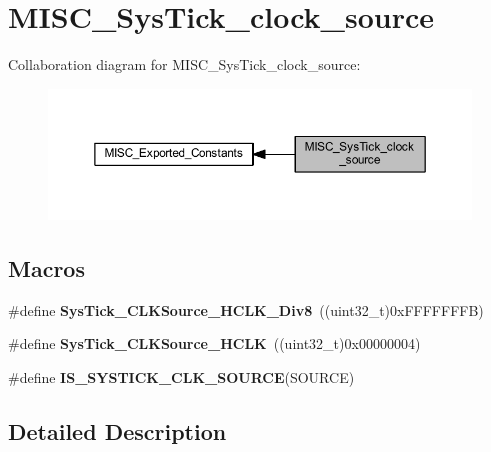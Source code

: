 \hypertarget{group___m_i_s_c___sys_tick__clock__source}{}\section{M\+I\+S\+C\+\_\+\+Sys\+Tick\+\_\+clock\+\_\+source}
\label{group___m_i_s_c___sys_tick__clock__source}
Collaboration diagram for M\+I\+S\+C\+\_\+\+Sys\+Tick\+\_\+clock\+\_\+source\+:
\nopagebreak
\begin{figure}[H]
\begin{center}
\leavevmode
\includegraphics[width=350pt]{group___m_i_s_c___sys_tick__clock__source}
\end{center}
\end{figure}
\subsection*{Macros}
\begin{DoxyCompactItemize}
\item 
\mbox{\label{group___m_i_s_c___sys_tick__clock__source_ga545c387ce43db90f15faad5f354f890d}} 
\#define {\bfseries Sys\+Tick\+\_\+\+C\+L\+K\+Source\+\_\+\+H\+C\+L\+K\+\_\+\+Div8}~((uint32\+\_\+t)0x\+F\+F\+F\+F\+F\+F\+F\+B)
\item 
\mbox{\label{group___m_i_s_c___sys_tick__clock__source_ga8a885ce2632ad4c35e229bb7c6e60191}} 
\#define {\bfseries Sys\+Tick\+\_\+\+C\+L\+K\+Source\+\_\+\+H\+C\+LK}~((uint32\+\_\+t)0x00000004)
\item 
\#define {\bfseries I\+S\+\_\+\+S\+Y\+S\+T\+I\+C\+K\+\_\+\+C\+L\+K\+\_\+\+S\+O\+U\+R\+CE}(S\+O\+U\+R\+CE)
\end{DoxyCompactItemize}


\subsection{Detailed Description}


